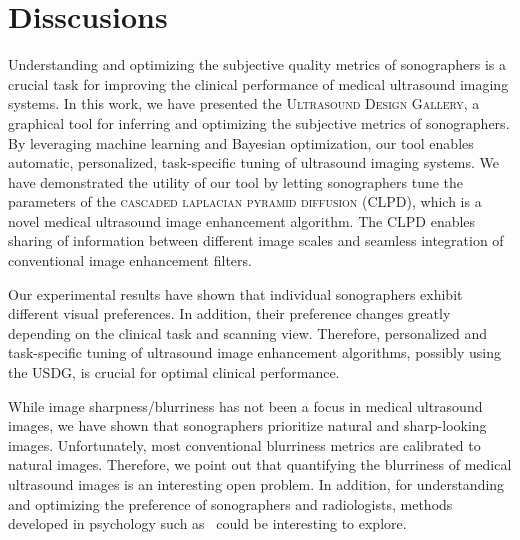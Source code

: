 

\section{Disscusions}\label{section:conclusion}
Understanding and optimizing the subjective quality metrics of sonographers is a crucial task for improving the clinical performance of medical ultrasound imaging systems.
In this work, we have presented the \textsc{Ultrasound Design Gallery}, a graphical tool for inferring and optimizing the subjective metrics of sonographers.
By leveraging machine learning and Bayesian optimization, our tool enables automatic, personalized, task-specific tuning of ultrasound imaging systems.
We have demonstrated the utility of our tool by letting sonographers tune the parameters of the \textsc{cascaded laplacian pyramid diffusion} (CLPD), which is a novel medical ultrasound image enhancement algorithm.
The CLPD enables sharing of information between different image scales and seamless integration of conventional image enhancement filters.

Our experimental results have shown that individual sonographers exhibit different visual preferences.
In addition, their preference changes greatly depending on the clinical task and scanning view.
Therefore, personalized and task-specific tuning of ultrasound image enhancement algorithms, possibly using the USDG, is crucial for optimal clinical performance.

While image sharpness/blurriness has not been a focus in medical ultrasound images, we have shown that sonographers prioritize natural and sharp-looking images.
Unfortunately, most conventional blurriness metrics are calibrated to natural images.
Therefore, we point out that quantifying the blurriness of medical ultrasound images is an interesting open problem.
In addition, for understanding and optimizing the preference of sonographers and radiologists, methods developed in psychology such as~\cite{NIPS2007_89d4402d} could be interesting to explore.

